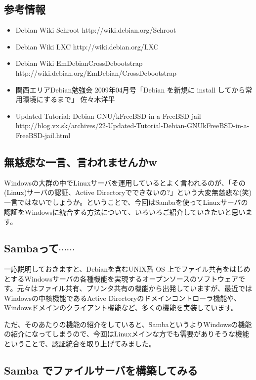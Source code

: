 \documentclass[mingoth,a4paper]{jsarticle}
\begin{document}
\subsection{参考情報}

\begin{itemize}
  \item{Debian Wiki Schroot http://wiki.debian.org/Schroot}
  \item{Debian Wiki LXC http://wiki.debian.org/LXC}
  \item{Debian Wiki EmDebianCrossDebootstrap http://wiki.debian.org/EmDebian/CrossDebootstrap}
  \item{関西エリアDebian勉強会 2009年04月号「Debian を新規に install してから常用環境にするまで」 佐々木洋平}
  \item{Updated Tutorial: Debian GNU/kFreeBSD in a FreeBSD jail  http://blog.vx.sk/archives/22-Updated-Tutorial-Debian-GNUkFreeBSD-in-a-FreeBSD-jail.html}
\end{itemize}


\subsection{無慈悲な一言、言われませんかw}
Windowsの大群の中でLinuxサーバを運用しているとよく言われるのが、「その(Linux)サーバの認証、Active Directoryでできないの?」という大変無慈悲な(笑)一言ではないでしょうか。ということで、今回はSambaを使ってLinuxサーバの認証をWindowsに統合する方法について、いろいろご紹介していきたいと思います。

\subsection{Sambaって$\cdots \cdots$}
一応説明しておきますと、Debianを含むUNIX系 OS 上でファイル共有をはじめとするWindowsサーバの各種機能を実現するオープンソースのソフトウェアです。元々はファイル共有、プリンタ共有の機能から出発していますが、最近ではWindowsの中核機能であるActive Directoryのドメインコントローラ機能や、Windowsドメインのクライアント機能など、多くの機能を実装しています。

ただ、そのあたりの機能の紹介をしていると、SambaというよりWindowsの機能の紹介になってしまうので、今回はLinuxメインな方でも需要がありそうな機能ということで、認証統合を取り上げてみました。

\subsection{Samba でファイルサーバを構築してみる}
\end{document}
